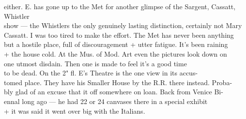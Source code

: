 \documentclass[11pt,a4paper]{article}
\begin{document}
{either. E. has gone up to the Met for another glimpse of the Sargent, Cassatt, Whistler \\
show --- the Whistlers the only genuinely lasting distinction, certainly not Mary \\
Cassatt. I was too tired to make the effort. The Met has never been anything \\
but a hostile place, full of discouragement + utter fatigue. It's been raining \\
+ the house cold. At the Mus. of Mod. Art even the pictures look down on \\
one  utmost disdain. Then one is made to feel it's a good time  \\
to be dead. On the 2" fl. E's \struck{\ill{}} Theatre is the one view in its accus- \\
tomed place. They have his Smaller House by the R.R. there instead. Proba- \\
bly glad of an excuse that it off somewhere on loan. Back from Venice Bi- \\
ennal long ago --- he had 22 or 24 canvases there in a special exhibit \\
+ it was said it went over big with the Italians.}



\end{document}
